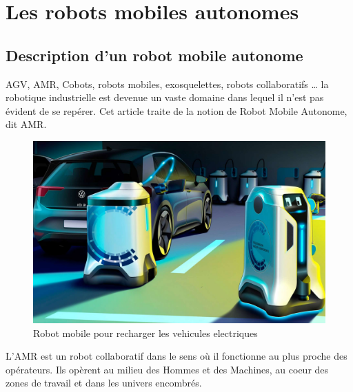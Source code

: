 \chapter{Les robots mobiles autonomes}
\section{Description d'un robot mobile autonome}
AGV, AMR, Cobots, robots mobiles, exosquelettes, robots collaboratifs … la robotique industrielle est devenue un vaste domaine dans lequel il n’est pas évident de se repérer. Cet article traite de la notion de Robot Mobile Autonome, dit AMR.

\begin{figure}[h]
    \centering
    \includegraphics[width=14cm]{assets/robot_autonome.jpg}
    \caption{Robot mobile pour recharger les vehicules electriques \cite{DescriptionRobotMobile}}
    \label{Tux}
    \end{figure}

L’AMR est un robot collaboratif dans le sens où il fonctionne au plus proche des opérateurs. Ils opèrent au milieu des Hommes et des Machines, au coeur des zones de travail et dans les univers encombrés.

